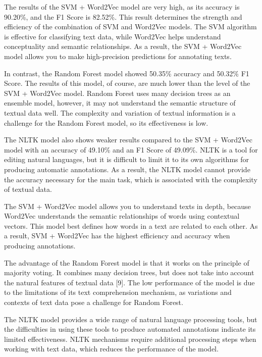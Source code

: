 \begin{multicols}{2}
The results of the SVM + Word2Vec model are very high, as its accuracy
is 90.20\%, and the F1 Score is 82.52\%. This result determines the
strength and efficiency of the combination of SVM and Word2Vec models.
The SVM algorithm is effective for classifying text data, while Word2Vec
helps understand conceptuality and semantic relationships. As a result,
the SVM + Word2Vec model allows you to make high-precision predictions
for annotating texts.

In contrast, the Random Forest model showed 50.35\% accuracy and 50.32\%
F1 Score. The results of this model, of course, are much lower than the
level of the SVM + Word2Vec model. Random Forest uses many decision
trees as an ensemble model, however, it may not understand the semantic
structure of textual data well. The complexity and variation of textual
information is a challenge for the Random Forest model, so its
effectiveness is low.

The NLTK model also shows weaker results compared to the SVM + Word2Vec
model with an accuracy of 49.10\% and an F1 Score of 49.09\%. NLTK is a
tool for editing natural languages, but it is difficult to limit it to
its own algorithms for producing automatic annotations. As a result, the
NLTK model cannot provide the accuracy necessary for the main task,
which is associated with the complexity of textual data.

The SVM + Word2Vec model allows you to understand texts in depth,
because Word2Vec understands the semantic relationships of words using
contextual vectors. This model best defines how words in a text are
related to each other. As a result, SVM + Word2Vec has the highest
efficiency and accuracy when producing annotations.

The advantage of the Random Forest model is that it works on the
principle of majority voting. It combines many decision trees, but does
not take into account the natural features of textual data {[}9{]}. The
low performance of the model is due to the limitations of its text
comprehension mechanism, as variations and contexts of text data pose a
challenge for Random Forest.

The NLTK model provides a wide range of natural language processing
tools, but the difficulties in using these tools to produce automated
annotations indicate its limited effectiveness. NLTK mechanisms require
additional processing steps when working with text data, which reduces
the performance of the model.


\end{multicols}
